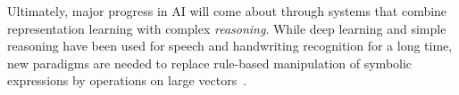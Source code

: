 \documentclass[10pts]{article}
\newcommand{\citep}[1]{\cite{#1}}
\begin{document}
Ultimately, major progress in AI will come about through systems that
combine representation learning with complex {\em reasoning}. While
deep learning and simple reasoning have been used for speech and
handwriting recognition for a long time, new paradigms are needed to
replace rule-based manipulation of symbolic expressions by operations on
large vectors~\citep{bottou-mlj-2014}.

 










\end{document}
